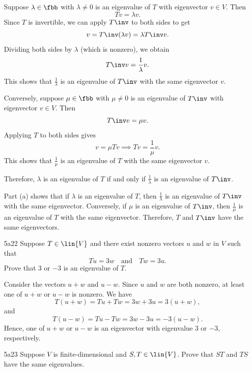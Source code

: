 \begin{solenum}
    \item Suppose $\lambda \in \fbb$ with $\lambda \neq 0$ is an eigenvalue of $T$ with eigenvector $v \in V$.
	Then
    \[
    	Tv = \lambda v.
    \]
    Since $T$ is invertible, we can apply $T\inv$ to both sides to get
    \[
    	v = T\inv (\lambda v) = \lambda T\inv v.
    \]
    Dividing both sides by $\lambda$ (which is nonzero), we obtain
    \[
    	T\inv v = \frac{1}{\lambda} v.
    \]
    This shows that $\frac{1}{\lambda}$ is an eigenvalue of $T\inv$ with the same eigenvector $v$.
    
    Conversely, suppose $\mu \in \fbb$ with $\mu \neq 0$ is an eigenvalue of $T\inv$ with eigenvector $v \in V$.
	Then
    \[
    	T\inv v = \mu v.
    \]
    Applying $T$ to both sides gives
    \[
    	v = \mu Tv \implies Tv = \frac{1}{\mu} v.
    \]
    This shows that $\frac{1}{\mu}$ is an eigenvalue of $T$ with the same eigenvector $v$.
    
    Therefore, $\lambda$ is an eigenvalue of $T$ if and only if $\frac{1}{\lambda}$ is an eigenvalue of $T\inv$.
    \item Part (a) shows that if $\lambda$ is an eigenvalue of $T$, then $\frac{1}{\lambda}$ is an eigenvalue of $T\inv$ with the same eigenvector.
	Conversely, if $\mu$ is an eigenvalue of $T\inv$, then $\frac{1}{\mu}$ is an eigenvalue of $T$ with the same eigenvector.
	Therefore, $T$ and $T\inv$ have the same eigenvectors.
\end{solenum}

\begin{exercise}{5a22}
    Suppose $T \in \lin{V}$ and there exist nonzero vectors $u$ and $w$ in $V$ such that
    \[
    	Tu = 3w \quad \text{and} \quad Tw = 3u.
    \]
    Prove that $3$ or $-3$ is an eigenvalue of $T$.
\end{exercise}

\begin{sol}
    Consider the vectors $u + w$ and $u - w$.
	Since $u$ and $w$ are both nonzero, at least one of $u + w$ or $u - w$ is nonzero.
	We have
    \[
    	T(u + w) = Tu + Tw = 3w + 3u = 3(u + w),
    \]
    and
    \[
    	T(u - w) = Tu - Tw = 3w - 3u = -3(u - w).
    \]
    Hence, one of $u + w$ or $u - w$ is an eigenvector with eigenvalue 3 or $-3$, respectively.
\end{sol}

\begin{exercise}{5a23}
    Suppose $V$ is finite-dimensional and $S, T \in \lin{V}$.
	Prove that $ST$ and $TS$ have the same eigenvalues.
\end{exercise}

